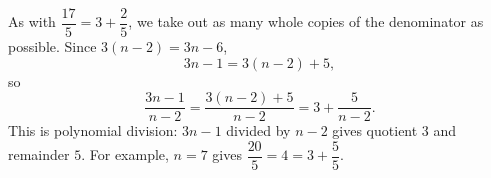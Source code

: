 As with $\dfrac{17}{5}=3+\dfrac25$, we take out as many whole copies of the denominator as possible. Since $3(n-2)=3n-6$,
\[3n-1=3(n-2)+5,\]
so
\[\dfrac{3n-1}{n-2}=\dfrac{3(n-2)+5}{n-2}=\boxed{3+\dfrac{5}{n-2}}.\]
This is polynomial division: $3n-1$ divided by $n-2$ gives quotient $3$ and remainder $5$. For example, $n=7$ gives $\dfrac{20}{5}=4=3+\dfrac55$.
